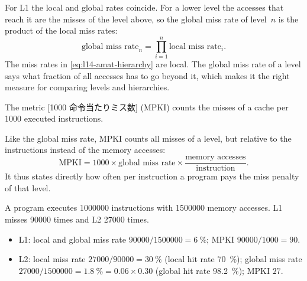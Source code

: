 \documentclass[../main.tex]{subfiles}
\begin{document}
For L1 the local and global rates coincide.  For a lower level the accesses
that reach it are the misses of the level above, so the global miss rate of
level~$n$ is the product of the local miss rates:
\begin{equation}
  \text{global miss rate}_n = \prod_{i=1}^{n} \text{local miss rate}_i .
  \label{eq:l14-global-miss}
\end{equation}
The miss rates in \cref{eq:l14-amat-hierarchy} are local.  The global miss
rate of a level says what fraction of all accesses has to go beyond it, which
makes it the right measure for comparing levels and hierarchies.

\begin{definition}
  The metric [1000 命令当たりミス数]%
   (MPKI) counts the misses of
  a cache per 1000 executed instructions.
\end{definition}

Like the global miss rate, MPKI counts all misses of a level, but relative to
the instructions instead of the memory accesses:
\begin{equation}
  \text{MPKI} = 1000 \times \text{global miss rate} \times
  \frac{\text{memory accesses}}{\text{instruction}} .
  \label{eq:l14-mpki}
\end{equation}
It thus states directly how often per instruction a program pays the miss
penalty of that level.

\begin{example}
  \label{ex:l14-local-global}
  A program executes \num{1000000} instructions with \num{1500000} memory
  accesses.  L1 misses \num{90000} times and L2 \num{27000} times.
  \begin{itemize}
    \item L1: local and global miss rate
      $\num{90000}/\num{1500000} = \SI{6}{\percent}$; MPKI
      $\num{90000}/1000 = 90$.
    \item L2: local miss rate $\num{27000}/\num{90000} = \SI{30}{\percent}$
      (local hit rate \SI{70}{\percent}); global miss rate
      $\num{27000}/\num{1500000} = \SI{1.8}{\percent} = 0.06\times 0.30$
      (global hit rate \SI{98.2}{\percent}); MPKI $27$.
  \end{itemize}
\end{example}
\end{document}
